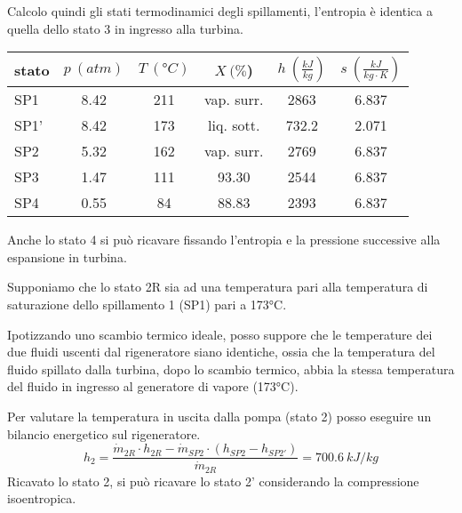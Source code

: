 Calcolo quindi gli stati termodinamici degli spillamenti, l'entropia è identica a quella dello stato 3 in ingresso alla turbina.
\begin{center}
    \begin{tabular}{l|c|c|c|c|c}
        stato    & $p\ (atm)$ & $T\ (\text{°}C) $&$X\ (\%$)& $h\ (\frac{kJ}{kg})$  & $s\ (\frac{kJ}{kg\cdot K})$\\ \hline
        SP1   &       8.42 &     211     & vap. surr. &  2863   &6.837 \\ \hline 
        SP1'    &       8.42    &173    &   liq. sott. &732.2   &2.071  \\ \hline
        SP2  &        5.32    &    162    & vap. surr. & 2769  &6.837 \\ \hline    
        SP3  &      1.47       &    111    &  93.30    &2544 &6.837   \\ \hline
        SP4   &    0.55      &      84    &    88.83   & 2393&6.837 
    \end{tabular}
\end{center}

Anche lo stato 4 si può ricavare fissando l'entropia e la pressione successive alla espansione in turbina.

Supponiamo che lo stato 2R sia ad una temperatura pari alla temperatura di saturazione dello spillamento 1 (SP1) pari a 173°C.

Ipotizzando uno scambio termico ideale, posso suppore che le temperature dei due fluidi uscenti dal rigeneratore siano identiche, ossia che la temperatura
del fluido spillato dalla turbina, dopo lo scambio termico, abbia la stessa temperatura del fluido in ingresso al generatore di vapore (173°C).

Per valutare la temperatura in uscita dalla pompa (stato 2) posso eseguire un bilancio energetico sul rigeneratore.
\begin{equation*}
    h_2 =\frac{ \dot m_{2R}\cdot h_{2R} - \dot m_{SP2}\cdot(h_{SP2}-h_{SP2'})}{\dot m_{2R}} = 700.6\ kJ/kg
\end{equation*}
Ricavato lo stato 2, si può ricavare lo stato 2' considerando la compressione isoentropica.

